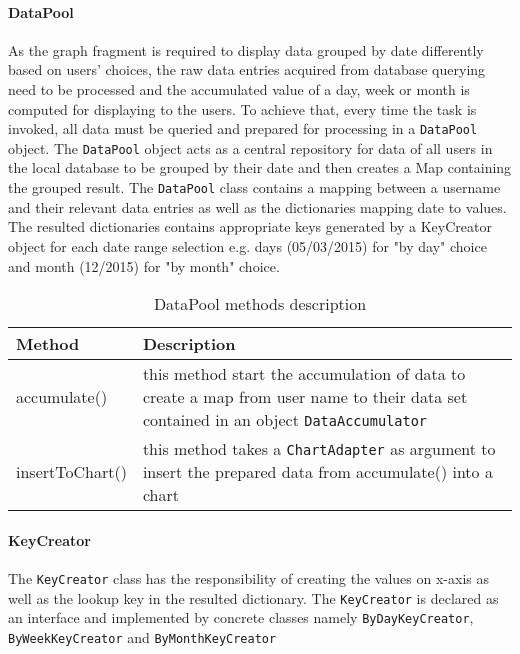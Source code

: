 \paragraph{DataPool}
As the graph fragment is required to display data grouped by date differently based on users' choices, the raw data
entries acquired from database querying need to be processed and the accumulated value of a day, week or month is
computed for displaying to the users. To achieve that, every time the task is invoked, all data must be queried and
prepared for processing in a \texttt{DataPool} object. The \texttt{DataPool} object acts as a central repository for
data of all users in the local database to be grouped by their date and then creates a Map containing the grouped
result. The \texttt{DataPool} class contains a mapping between a username and their relevant data entries as well as the
dictionaries mapping date to values. The resulted dictionaries contains appropriate keys generated by a KeyCreator
object for each date range selection e.g. days (05/03/2015) for "by day" choice and month (12/2015) for "by month"
choice.

\begin{table}[h]
\begin{center}
    \begin{tabular}{| l | p{12cm} |}
        \hline Method & Description \\
        \hline accumulate() & 
            this method start the accumulation of data to create a map from user name to their data set contained in an
            object \texttt{DataAccumulator} \\
        \hline insertToChart() &
            this method takes a \texttt{ChartAdapter} as argument to insert the prepared data from accumulate() into a
            chart \\
        \hline
    \end{tabular}
    \caption{DataPool methods description}
\end{center}
\end{table}

\paragraph{KeyCreator}
The \texttt{KeyCreator} class has the responsibility of creating the values on x-axis as well as the lookup key in the
resulted dictionary. The \texttt{KeyCreator} is declared as an interface and implemented by concrete classes namely
\texttt{ByDayKeyCreator}, \texttt{ByWeekKeyCreator} and \texttt{ByMonthKeyCreator}


